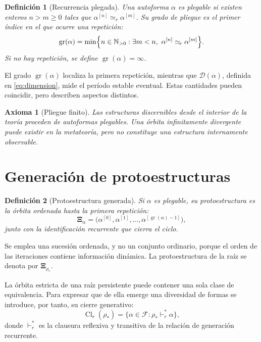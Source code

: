 \documentclass[11pt]{article}
\numberwithin{equation}{section}
\theoremstyle{prism}
\newtheorem{axiomacap}{Axioma}
\newtheorem{defcap}{Definición}
\newcommand{\F}{\mathcal{F}}
\newcommand{\N}{\mathbb{N}}
\newcommand{\raiz}{\rho_{\!*}}
\newcommand{\iter}[2]{#1^{[#2]}}
\newcommand{\peq}{\simeq_{\!r}}
\newcommand{\Proto}[1]{\boldsymbol{\Xi}_{#1}}
\DeclareMathOperator{\gr}{gr}
\DeclareMathOperator{\Cl}{Cl}
\begin{document}
\begin{defcap}[Recurrencia plegada]
Una autoforma $\alpha$ es \emph{plegable} si existen enteros $n>m\geq0$ tales
que $\iter{\alpha}{n}\peq\iter{\alpha}{m}$. Su grado de pliegue es el primer
índice en el que ocurre una repetición:
\begin{equation}
  \gr(\alpha)
  =\min\Bigl\{n\in\N_{>0}:\exists m<n,
  \ \iter{\alpha}{n}\peq\iter{\alpha}{m}\Bigr\}.
  \label{eq:grado-pliegue}
\end{equation}
Si no hay repetición, se define $\gr(\alpha)=\infty$.
\end{defcap}

El grado $\gr(\alpha)$ localiza la primera repetición, mientras que
$\mathcal D(\alpha)$, definida en \eqref{eq:dimension}, mide el período estable
eventual. Estas cantidades pueden coincidir, pero describen aspectos distintos.

\begin{axiomacap}[Pliegue finito]
Las estructuras discernibles desde el interior de la teoría proceden de
autoformas plegables. Una órbita infinitamente divergente puede existir en la
metateoría, pero no constituye una estructura internamente observable.
\end{axiomacap}

\section{Generación de protoestructuras}

\begin{defcap}[Protoestructura generada]
Si $\alpha$ es plegable, su protoestructura es la órbita ordenada hasta la
primera repetición:
\begin{equation}
  \Proto{\alpha}
  =\bigl(
    \iter{\alpha}{0},
    \iter{\alpha}{1},
    \ldots,
    \iter{\alpha}{\gr(\alpha)-1}
  \bigr),
  \label{eq:protoestructura-generada}
\end{equation}
junto con la identificación recurrente que cierra el ciclo.
\end{defcap}

Se emplea una sucesión ordenada, y no un conjunto ordinario, porque el orden de
las iteraciones contiene información dinámica. La protoestructura de la raíz se
denota por $\Proto{\raiz}$.

La órbita estricta de una raíz persistente puede contener una sola clase de
equivalencia. Para expresar que de ella emerge una diversidad de formas se
introduce, por tanto, su cierre generativo:
\begin{equation}
  \Cl_r(\raiz)
  =\bigl\{\alpha\in\F:\raiz\vdash_r^{*}\alpha\bigr\},
  \label{eq:cierre-generativo}
\end{equation}
donde $\vdash_r^{*}$ es la clausura reflexiva y transitiva de la relación de
generación recurrente.
\end{document}
